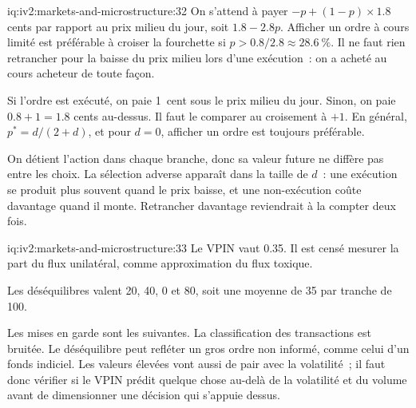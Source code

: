 \begin{solution}{iq:iv2:markets-and-microstructure:32}
On s'attend à payer $-p + (1 - p) \times 1.8$ cents par rapport au prix milieu du jour, soit $1.8 - 2.8p$. Afficher un ordre à cours limité est préférable à croiser la fourchette si $p > 0.8/2.8 \approx 28.6~\%$. Il ne faut rien retrancher pour la baisse du prix milieu lors d'une exécution~: on a acheté au cours acheteur de toute façon.

Si l'ordre est exécuté, on paie 1~cent sous le prix milieu du jour. Sinon, on paie $0.8 + 1 = 1.8$ cents au-dessus. Il faut le comparer au croisement à $+1$. En général, $p^* = d/(2 + d)$, et pour $d = 0$, afficher un ordre est toujours préférable.

On détient l'action dans chaque branche, donc sa valeur future ne diffère pas entre les choix. La sélection adverse apparaît dans la taille de $d$~: une exécution se produit plus souvent quand le prix baisse, et une non-exécution coûte davantage quand il monte. Retrancher davantage reviendrait à la compter deux fois.

\end{solution}

\begin{solution}{iq:iv2:markets-and-microstructure:33}
Le VPIN vaut 0.35. Il est censé mesurer la part du flux unilatéral, comme approximation du flux toxique.

Les déséquilibres valent 20, 40, 0 et 80, soit une moyenne de 35 par tranche de 100.

Les mises en garde sont les suivantes. La classification des transactions est bruitée. Le déséquilibre peut refléter un gros ordre non informé, comme celui d'un fonds indiciel. Les valeurs élevées vont aussi de pair avec la volatilité~; il faut donc vérifier si le VPIN prédit quelque chose au-delà de la volatilité et du volume avant de dimensionner une décision qui s'appuie dessus.

\end{solution}

